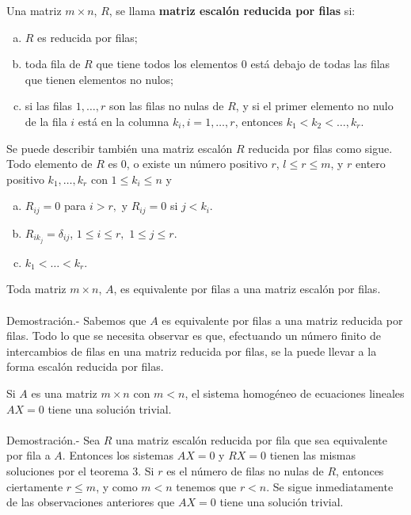\begin{def.}
    Una matriz $m\times n$, $R$, se llama \textbf{matriz escalón reducida por filas} si:
    \begin{enumerate}[(a)]
	\item $R$ es reducida por filas;
	\item toda fila de $R$ que tiene todos los elementos $0$ está debajo de todas las filas que tienen elementos no nulos;
	\item si las filas $1,\ldots, r$ son las filas no nulas de $R$, y si el primer elemento no nulo de la fila $i$ está en la columna $k_i, i=1,\ldots, r$, entonces $k_1<k_2<\ldots,k_r.$
    \end{enumerate}
    Se puede describir también una matriz escalón $R$ reducida por filas como sigue. Todo elemento de $R$ es $0$, o existe un número positivo $r$, $l\leq r \leq m$, y $r$ entero positivo $k_1,\ldots ,k_r$ con $1\leq k_i\leq n$ y
    \begin{enumerate}[(a)]
	\item $R_{ij}=0$ para $i>r,$ y $R_{ij}=0$ si $j<k_i$.
	\item $R_{ik_j}=\delta_{ij}$, $1\leq i \leq r,$ $1\leq j\leq r$.
	\item $k_1<\ldots < k_r$.
    \end{enumerate}
\end{def.}

\begin{teo}
    Toda matriz $m\times n$, $A$, es equivalente por filas a una matriz escalón por filas.\\\\
	Demostración.-\; Sabemos que $A$ es equivalente por filas a una matriz reducida por filas. Todo lo que se necesita observar es que, efectuando un número finito de intercambios de filas en una matriz reducida por filas, se la puede llevar a la forma escalón reducida por filas.
\end{teo}
















\begin{teo}
    Si $A$ es una matriz $m\times n$ con $m<n$, el sistema homogéneo de ecuaciones lineales $AX=0$ tiene una solución trivial.\\\\
	Demostración.-\; Sea $R$ una matriz escalón reducida por fila que sea equivalente por fila a $A$. Entonces los sistemas $AX=0$ y $RX=0$ tienen las mismas soluciones por el teorema 3. Si $r$ es el número de filas no nulas de $R$, entonces ciertamente $r\leq m$, y como $m<n$ tenemos que $r<n$. Se sigue inmediatamente de las observaciones anteriores que $AX=0$ tiene una solución trivial.
\end{teo}

